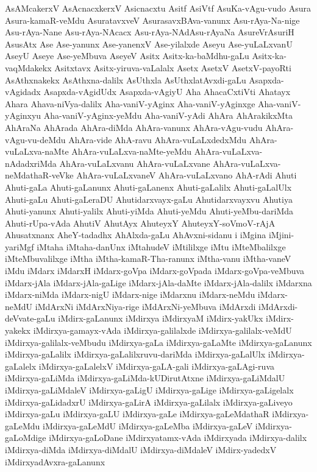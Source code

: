 {AsAMcakerxV
AsAcnacxkerxV
Asicnacxtu
Asitf
AsiVtf
AsuKa-vAgu-vudo
Asura
Asura-kamaR-veMdu
AsuratavxveV
AsurasavxBAva-vanunx
Asu-rAya-Na-nige
Asu-rAya-Nane
Asu-rAya-NAcacx
Asu-rAya-NAdAsu-rAyaNa
AsureVrAsuriH
AsusAtx
Ase
Ase-yanunx
Ase-yanenxV
Ase-yilalxde
Aseyu
Ase-yuLaLxvanU
AseyU
Aseye
Ase-yeMbuva
AseyeV
Asitx
Asitx-ka-baMdhu-gaLu
Asitx-ka-vaqMdakekx
Asitxtavx
Asitx-yiruva-vaLalalx
Asetx
AsetxV
AsetxV-payoRti
AsAthxnakekx
AsAthxna-dalilx
AsUthxla
AsUthxlatAvxdi-gaLu
Asapxda-vAgidadx
Asapxda-vAgidUdx
Asapxda-vAgiyU
Aha
AhacaCxtiVti
Ahatayx
Ahara
Ahava-niVya-dalilx
Aha-vaniV-yAginx
Aha-vaniV-yAginxge
Aha-vaniV-yAginxyu
Aha-vaniV-yAginx-yeMdu
Aha-vaniV-yAdi
AhAra
AhArakikxMta
AhAraNa
AhArada
AhAra-diMda
AhAra-vanunx
AhAra-vAgu-vudu
AhAra-vAgu-vu-deMdu
AhAra-vide
AhA-ravu
AhAra-vuLaLxdedxMdu
AhAra-vuLaLxva-naMte
AhAra-vuLaLxva-naMte-yeMdu
AhAra-vuLaLxva-nAdadxriMda
AhAra-vuLaLxvanu
AhAra-vuLaLxvane
AhAra-vuLaLxva-neMdathaR-veVke
AhAra-vuLaLxvaneV
AhAra-vuLaLxvano
AhA-rAdi
Ahuti
Ahuti-gaLa
Ahuti-gaLanunx
Ahuti-gaLanenx
Ahuti-gaLalilx
Ahuti-gaLalUlx
Ahuti-gaLu
Ahuti-gaLeraDU
Ahutidarxvayx-gaLu
Ahutidarxvayxvu
Ahutiya
Ahuti-yanunx
Ahuti-yalilx
Ahuti-yiMda
Ahuti-yeMdu
Ahuti-yeMbu-dariMda
Ahuti-rUpa-vAda
AhutiV
AhutAyx
AhuteyxY
AhuteyxY-soVmoV-rAjA
Ahusatxnanx
AheY-tadadhx
AhAlxda-gaLu
AhAvxni-sidanu
i
iMgina
iMjini-yariMgf
iMtaha
iMtaha-danUnx
iMtahudeV
iMtililxge
iMtu
iMteMbalilxge
iMteMbuvalilxge
iMtha
iMtha-kamaR-Tha-ranunx
iMtha-vanu
iMtha-vaneV
iMdu
iMdarx
iMdarxH
iMdarx-goVpa
iMdarx-goVpada
iMdarx-goVpa-veMbuva
iMdarx-jAla
iMdarx-jAla-gaLige
iMdarx-jAla-daMte
iMdarx-jAla-dalilx
iMdarxna
iMdarx-niMda
iMdarx-nigU
iMdarx-nige
iMdarxnu
iMdarx-neMdu
iMdarx-neMdU
iMdArxNi
iMdArxNiya-rige
iMdArxNi-yeMbuva
iMdArxdi
iMdArxdi-deVvate-gaLu
iMdirx-gaLanunx
iMdirxya
iMdirxyaM
iMdirx-yakUkx
iMdirx-yakekx
iMdirxya-gamayx-vAda
iMdirxya-galilalxde
iMdirxya-galilalx-veMdU
iMdirxya-galilalx-veMbudu
iMdirxya-gaLa
iMdirxya-gaLaMte
iMdirxya-gaLanunx
iMdirxya-gaLalilx
iMdirxya-gaLalilxruvu-dariMda
iMdirxya-gaLalUlx
iMdirxya-gaLalelx
iMdirxya-gaLalelxV
iMdirxya-gaLA-gali
iMdirxya-gaLAgi-ruva
iMdirxya-gaLiMda
iMdirxya-gaLiMda-kUDirutAtxne
iMdirxya-gaLiMdalU
iMdirxya-gaLiMdaleV
iMdirxya-gaLigU
iMdirxya-gaLige
iMdirxya-gaLigelalx
iMdirxya-gaLidadxrU
iMdirxya-gaLirA
iMdirxya-gaLilalx
iMdirxya-gaLiveyo
iMdirxya-gaLu
iMdirxya-gaLU
iMdirxya-gaLe
iMdirxya-gaLeMdathaR
iMdirxya-gaLeMdu
iMdirxya-gaLeMdU
iMdirxya-gaLeMba
iMdirxya-gaLeV
iMdirxya-gaLoMdige
iMdirxya-gaLoDane
iMdirxyatamx-vAda
iMdirxyada
iMdirxya-dalilx
iMdirxya-diMda
iMdirxya-diMdalU
iMdirxya-diMdaleV
iMdirx-yadedxV
iMdirxyadAvxra-gaLanunx
}
